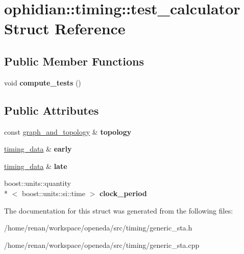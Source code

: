 \hypertarget{structophidian_1_1timing_1_1test__calculator}{\section{ophidian\-:\-:timing\-:\-:test\-\_\-calculator Struct Reference}
\label{structophidian_1_1timing_1_1test__calculator}
}
\subsection*{Public Member Functions}
\begin{DoxyCompactItemize}
\item 
\hypertarget{structophidian_1_1timing_1_1test__calculator_a5f8d4d44e99db39a32e2ac4bb7413bb8}{void {\bfseries compute\-\_\-tests} ()}\label{structophidian_1_1timing_1_1test__calculator_a5f8d4d44e99db39a32e2ac4bb7413bb8}

\end{DoxyCompactItemize}
\subsection*{Public Attributes}
\begin{DoxyCompactItemize}
\item 
\hypertarget{structophidian_1_1timing_1_1test__calculator_a32ad1b5a7adb0e297172edacc1da1374}{const \hyperlink{structophidian_1_1timing_1_1graph__and__topology}{graph\-\_\-and\-\_\-topology} \& {\bfseries topology}}\label{structophidian_1_1timing_1_1test__calculator_a32ad1b5a7adb0e297172edacc1da1374}

\item 
\hypertarget{structophidian_1_1timing_1_1test__calculator_af0b07b49d10ef6ef40f129e9eb1d5558}{\hyperlink{structophidian_1_1timing_1_1timing__data}{timing\-\_\-data} \& {\bfseries early}}\label{structophidian_1_1timing_1_1test__calculator_af0b07b49d10ef6ef40f129e9eb1d5558}

\item 
\hypertarget{structophidian_1_1timing_1_1test__calculator_abbbadad93c26611d4787b3956e2e94c8}{\hyperlink{structophidian_1_1timing_1_1timing__data}{timing\-\_\-data} \& {\bfseries late}}\label{structophidian_1_1timing_1_1test__calculator_abbbadad93c26611d4787b3956e2e94c8}

\item 
\hypertarget{structophidian_1_1timing_1_1test__calculator_a6e96f28e077db11869ae129a398f4533}{boost\-::units\-::quantity\\*
$<$ boost\-::units\-::si\-::time $>$ {\bfseries clock\-\_\-period}}\label{structophidian_1_1timing_1_1test__calculator_a6e96f28e077db11869ae129a398f4533}

\end{DoxyCompactItemize}


The documentation for this struct was generated from the following files\-:\begin{DoxyCompactItemize}
\item 
/home/renan/workspace/openeda/src/timing/generic\-\_\-sta.\-h\item 
/home/renan/workspace/openeda/src/timing/generic\-\_\-sta.\-cpp\end{DoxyCompactItemize}
